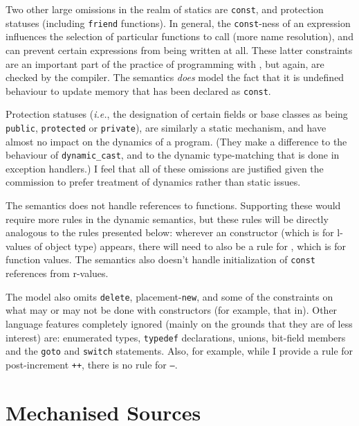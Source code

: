\documentclass[11pt]{article}
\newcommand{\ie}{\emph{i.e.}}
\begin{document}
Two other large omissions in the realm of statics are \texttt{const},
and protection statuses (including \texttt{friend} functions).  In
general, the \texttt{const}-ness of an expression influences the
selection of particular functions to call (more name resolution), and
can prevent certain expressions from being written at all.  These
latter constraints are an important part of the practice of
programming with \cpp{}, but again, are checked by the compiler.  The
semantics \emph{does} model the fact that it is undefined behaviour to
update memory that has been declared as \texttt{const}.

Protection statuses (\ie, the designation of certain fields or base
classes as being \texttt{public}, \texttt{protected} or
\texttt{private}), are similarly a static mechanism, and have almost
no impact on the dynamics of a program.  (They make a difference to
the behaviour of \texttt{dynamic_cast}, and to the dynamic
type-matching that is done in exception handlers.)  I feel that all of
these omissions are justified given the commission to prefer treatment
of dynamics rather than static issues.

The semantics does not handle references to functions.  Supporting
these would require more rules in the dynamic semantics, but these
rules will be directly analogous to the rules presented below:
wherever an \clvalue{} constructor (which is for l-values of object
type) appears, there will need to also be a rule for \cfvalue{}, which
is for function values. The semantics also doesn't handle
initialization of \texttt{const} references from r-values.

The model also omits \texttt{delete}, placement-\texttt{new}, and some
of the constraints on what may or may not be done with constructors
(for example, that in\cite[\S12.1,~para~15]{cpp-standard-iso14882}).
Other language features completely ignored (mainly on the grounds that
they are of less interest) are: enumerated types, \texttt{typedef}
declarations, unions, bit-field members and the \texttt{goto} and
\texttt{switch} statements.  Also, for example, while I provide a rule
for post-increment \texttt{++}, there is no rule for \texttt{--}.

\appendix
\section{Mechanised Sources}
\label{sec:sources}
\end{document}
